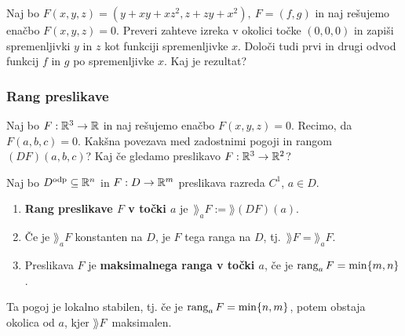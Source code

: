 \begin{zgled}
    Naj bo $F(x,y,z) = (y + xy+xz^2, z+zy+x^2), \ F = (f, g)$ in naj rešujemo enačbo $F(x,y,z) = 0$. Preveri zahteve izreka v okolici točke $(0,0,0)$ in zapiši spremenljivki $y$ in $z$ kot funkciji spremenljivke $x$. Določi tudi prvi in drugi odvod funkcij $f$ in $g$ po spremenljivke $x$. Kaj je rezultat?
\end{zgled}

\subsubsection{Rang preslikave}
\begin{zgled}
    Naj bo $F: \mathbb{R}^3 \to \mathbb{R}$ in naj rešujemo enačbo $F(x,y,z) = 0$. Recimo, da $F(a,b,c) = 0$. Kakšna povezava med zadostnimi pogoji in rangom $(DF)(a,b,c)$? Kaj če gledamo preslikavo $F: \mathbb{R}^3 \to \mathbb{R}^2$?
\end{zgled}

\begin{definicija}
    Naj bo $D^\text{odp} \subseteq \mathbb{R}^n$ in $F: D \to \mathbb{R}^m$ preslikava razreda $C^1$, $a \in D$. 
    \begin{enumerate}
        \item \textbf{Rang preslikave $F$ v točki $a$} je~$\rang_aF := \rang (DF)(a)$.
        \item Če je $\rang_aF$ konstanten na $D$, je $F$ tega ranga na $D$, tj.\ $\rang F = \rang_aF$.
        \item Preslikava $F$ je \textbf{maksimalnega ranga v točki $a$}, če je $\operatorname{rang}_aF = \min \{m, n\}$.
    \end{enumerate}      
\end{definicija}

\begin{opomba}
    Ta pogoj je lokalno stabilen, tj. če je $\operatorname{rang}_aF = \min \{n, m\}$, potem obstaja okolica od $a$, kjer $\rang F$~maksimalen.
\end{opomba}

